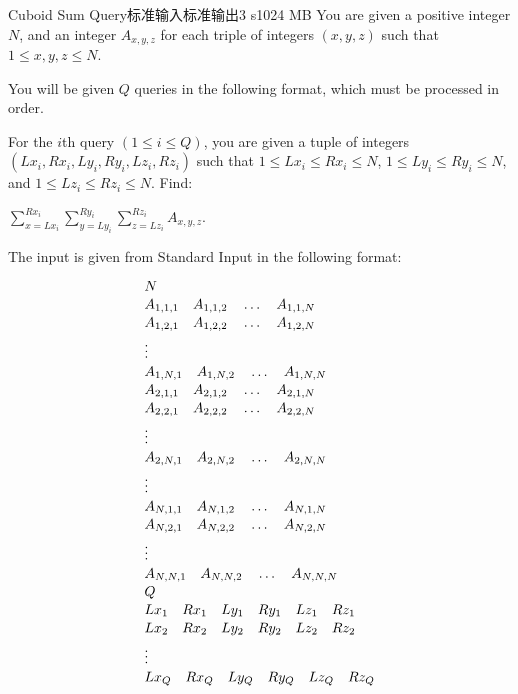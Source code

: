 \begin{problem}{Cuboid Sum Query}{标准输入}{标准输出}{3 s}{1024 MB}
You are given a positive integer $N$, and an integer $A_{x,y,z}$ for each triple of integers $(x, y, z)$ such that $1 \leq x, y, z \leq N$.

You will be given $Q$ queries in the following format, which must be processed in order.

For the $i$\-th query $(1 \leq i \leq Q)$, you are given a tuple of integers $(Lx_i, Rx_i, Ly_i, Ry_i, Lz_i, Rz_i)$ such that $1 \leq Lx_i \leq Rx_i \leq N$, $1 \leq Ly_i \leq Ry_i \leq N$, and $1 \leq Lz_i \leq Rz_i \leq N$. Find:

$\displaystyle{\sum_{x=Lx_i}^{Rx_i} \sum_{y=Ly_i}^{Ry_i} \sum_{z=Lz_i}^{Rz_i} A_{x,y,z}}$.

\InputFile
The input is given from Standard Input in the following format:

$$
{\fontsize{10pt}{10pt}\selectfont
\begin{aligned}
& N \\
& A_{1,1,1} \quad A_{1,1,2} \quad \ldots \quad A_{1,1,N} \\
& A_{1,2,1} \quad A_{1,2,2} \quad \ldots \quad A_{1,2,N} \\
& \vdots \\
& A_{1,N,1} \quad A_{1,N,2} \quad \ldots \quad A_{1,N,N} \\
& A_{2,1,1} \quad A_{2,1,2} \quad \ldots \quad A_{2,1,N} \\
& A_{2,2,1} \quad A_{2,2,2} \quad \ldots \quad A_{2,2,N} \\
& \vdots \\
& A_{2,N,1} \quad A_{2,N,2} \quad \ldots \quad A_{2,N,N} \\
& \vdots \\
& A_{N,1,1} \quad A_{N,1,2} \quad \ldots \quad A_{N,1,N} \\
& A_{N,2,1} \quad A_{N,2,2} \quad \ldots \quad A_{N,2,N} \\
& \vdots \\
& A_{N,N,1} \quad A_{N,N,2} \quad \ldots \quad A_{N,N,N} \\
& Q \\
& Lx_1 \quad Rx_1 \quad Ly_1 \quad Ry_1 \quad Lz_1 \quad Rz_1 \\
& Lx_2 \quad Rx_2 \quad Ly_2 \quad Ry_2 \quad Lz_2 \quad Rz_2 \\
& \vdots \\
& Lx_Q \quad Rx_Q \quad Ly_Q \quad Ry_Q \quad Lz_Q \quad Rz_Q
\end{aligned}
} %
$$


\end{problem}
